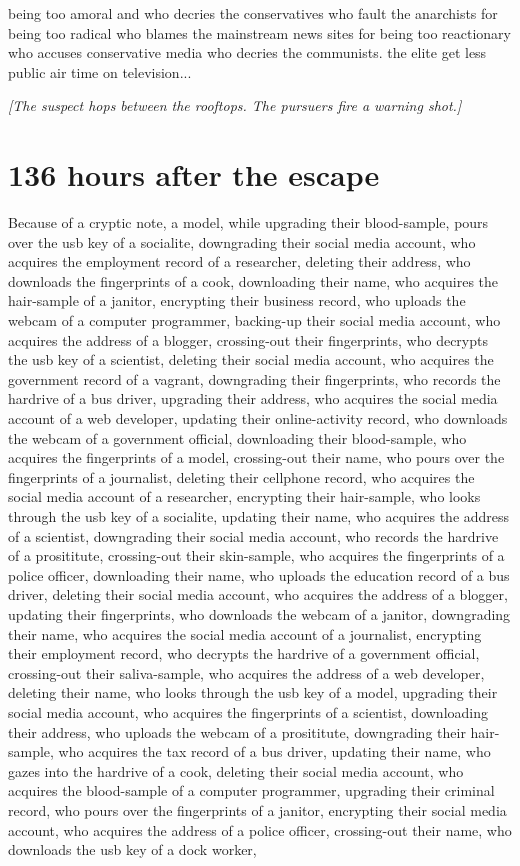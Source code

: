 \documentclass{report}
\begin{document}
being too amoral and who decries the conservatives who fault the anarchists for being too radical who blames the mainstream news sites for being too reactionary who accuses conservative media who decries the communists. the elite get less public air time on television...

\textit{[The suspect hops between the rooftops. The pursuers fire a warning shot.]}


\section*{136 \small{hours after the escape}}

Because of a cryptic note, a model, while upgrading their blood-sample, pours over the usb key of a socialite, downgrading their social media account, who acquires the employment record of a researcher, deleting their address, who downloads the fingerprints of a cook, downloading their name, who acquires the hair-sample of a janitor, encrypting their business record, who uploads the webcam of a computer programmer, backing-up their social media account, who acquires the address of a blogger, crossing-out their fingerprints, who decrypts the usb key of a scientist, deleting their social media account, who acquires the government record of a vagrant, downgrading their fingerprints, who records the hardrive of a bus driver, upgrading their address, who acquires the social media account of a web developer, updating their online-activity record, who downloads the webcam of a government official, downloading their blood-sample, who acquires the fingerprints of a model, crossing-out their name, who pours over the fingerprints of a journalist, deleting their cellphone record, who acquires the social media account of a researcher, encrypting their hair-sample, who looks through the usb key of a socialite, updating their name, who acquires the address of a scientist, downgrading their social media account, who records the hardrive of a prosititute, crossing-out their skin-sample, who acquires the fingerprints of a police officer, downloading their name, who uploads the education record of a bus driver, deleting their social media account, who acquires the address of a blogger, updating their fingerprints, who downloads the webcam of a janitor, downgrading their name, who acquires the social media account of a journalist, encrypting their employment record, who decrypts the hardrive of a government official, crossing-out their saliva-sample, who acquires the address of a web developer, deleting their name, who looks through the usb key of a model, upgrading their social media account, who acquires the fingerprints of a scientist, downloading their address, who uploads the webcam of a prosititute, downgrading their hair-sample, who acquires the tax record of a bus driver, updating their name, who gazes into the hardrive of a cook, deleting their social media account, who acquires the blood-sample of a computer programmer, upgrading their criminal record, who pours over the fingerprints of a janitor, encrypting their social media account, who acquires the address of a police officer, crossing-out their name, who downloads the usb key of a dock worker, 
\end{document}
